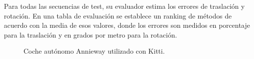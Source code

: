 \begin {enumerate}
Para todas las secuencias de test, su evaluador estima los errores de traslación y rotación. En una tabla de evaluación se establece un ranking de métodos de acuerdo con la media de esos valores, donde los errores son medidos en porcentaje para la traslación y en grados por metro para la rotación.
\begin{figure}[H]
\begin{center}
\end{center}
\caption{Coche autónomo Annieway utilizado con Kitti.}
\end{figure}

\end {enumerate}



\clearpage
\newpage
\pagebreak










